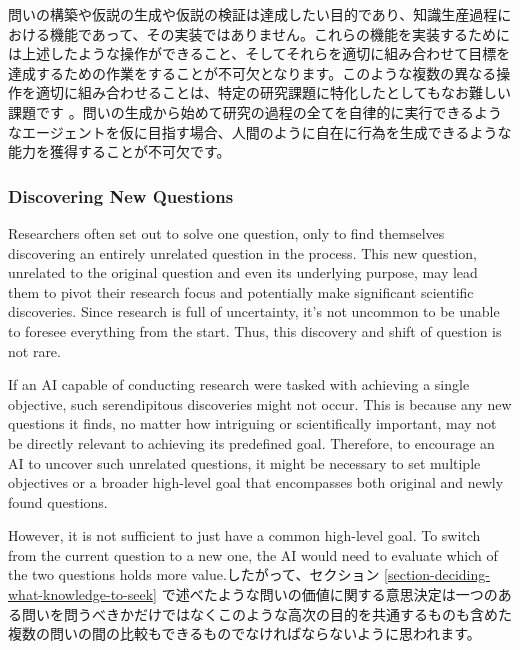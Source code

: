 問いの構築や仮説の生成や仮説の検証は達成したい目的であり、知識生産過程における機能であって、その実装ではありません。これらの機能を実装するためには上述したような操作ができること、そしてそれらを適切に組み合わせて目標を達成するための作業をすることが不可欠となります。このような複数の異なる操作を適切に組み合わせることは、特定の研究課題に特化したとしてもなお難しい課題です \cite{coley2020autonomousII}。問いの生成から始めて研究の過程の全てを自律的に実行できるようなエージェントを仮に目指す場合、人間のように自在に行為を生成できるような能力を獲得することが不可欠です。

\subsubsection{Discovering New Questions}
Researchers often set out to solve one question, only to find themselves discovering an entirely unrelated question in the process. This new question, unrelated to the original question and even its underlying purpose, may lead them to pivot their research focus and potentially make significant scientific discoveries. Since research is full of uncertainty, it's not uncommon to be unable to foresee everything from the start. Thus, this discovery and shift of question is not rare.

If an AI capable of conducting research were tasked with achieving a single objective, such serendipitous discoveries might not occur. This is because any new questions it finds, no matter how intriguing or scientifically important, may not be directly relevant to achieving its predefined goal. Therefore, to encourage an AI to uncover such unrelated questions, it might be necessary to set multiple objectives or a broader high-level goal that encompasses both original and newly found questions. 

However, it is not sufficient to just have a common high-level goal.
To switch from the current question to a new one, the AI would need to evaluate which of the two questions holds more value.したがって、セクション \ref{section-deciding-what-knowledge-to-seek} で述べたような問いの価値に関する意思決定は一つのある問いを問うべきかだけではなくこのような高次の目的を共通するものも含めた複数の問いの間の比較もできるものでなければならないように思われます。


